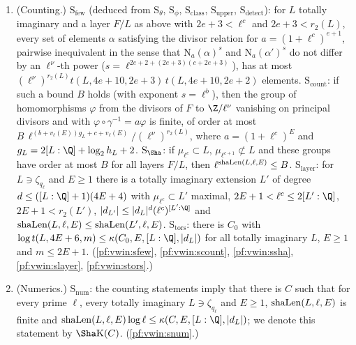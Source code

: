 \begin{enumerate}[label=(K\arabic*)]
$\Z/\ell^\nu$-module, the set of values $\ell^k\Phi(y)$ on cycles $y$ has at most $(\ell^\nu)^{r_2(L)}\,t(L,2k+6,k+1)\,t(L,2k+6,k)$ elements, where
$t(L,N,m)$ is the order of the torsion of $H_m(\GL_N(\OO_L),\Z)$. (\cref{pf:vwin:sclass}, \cref{pf:vwin:supper}.)
\item\label{pf:vwin:K6} (Counting.) $\mathrm{S}_{\mathrm{few}}$ (deduced from $\mathrm{S}_\theta$, $\mathrm{S}_\phi$, $\mathrm{S}_{\mathrm{class}}$,
$\mathrm{S}_{\mathrm{upper}}$, $\mathrm{S}_{\mathrm{detect}}$): for $L$ totally imaginary and a layer $F/L$ as above with $2e+3<\ell^c$ and
$2e+3<r_2(L)$, every set of elements $\alpha$ satisfying the divisor relation for $a=(1+\ell^c)^{e+1}$, pairwise inequivalent in the sense that
$\mathrm{N}_a(\alpha)^s$ and $\mathrm{N}_a(\alpha')^s$ do not differ by an $\ell^\nu$-th power ($s=\ell^{2e+2+(2e+3)(c+2e+3)}$), has at most
$(\ell^\nu)^{r_2(L)}t(L,4e+10,2e+3)\,t(L,4e+10,2e+2)$ elements. $\mathrm{S}_{\mathrm{count}}$: if such a bound $B$ holds (with exponent $s=\ell^b$), then the
group of homomorphisms $\varphi$ from the divisors of $F$ to $\Z/\ell^\nu$ vanishing on principal divisors and with $\varphi\circ\gamma^{-1}=a\varphi$ is finite,
of order at most $B\,\ell^{(b+v_\ell(E))g_L+c+v_\ell(E)}/(\ell^\nu)^{r_2(L)}$, where $a=(1+\ell^c)^E$ and $g_L=2[L:\Q]+\log_2h_L+2$.
$\mathrm{S}_\Sha$: if $\mu_{\ell^c}\subset L$, $\mu_{\ell^{c+1}}\not\subset L$ and these groups have order at most $B$ for all layers $F/L$, then
$\ell^{\mathrm{shaLen}(L,\ell,E)}\le B$. $\mathrm{S}_{\mathrm{layer}}$: for $L\ni\zeta_{q_\ell}$ and $E\ge1$ there is a totally imaginary extension $L'$ of degree
$d\le([L:\Q]+1)(4E+4)$ with $\mu_{\ell^c}\subset L'$ maximal, $2E+1<\ell^c\le2[L':\Q]$, $2E+1<r_2(L')$, $|d_{L'}|\le|d_L|^d(\ell^c)^{[L':\Q]}$ and
$\mathrm{shaLen}(L,\ell,E)\le\mathrm{shaLen}(L',\ell,E)$. $\mathrm{S}_{\mathrm{tors}}$: there is $C_0$ with $\log t(L,4E+6,m)\le\kappa(C_0,E,[L:\Q],|d_L|)$ for all
totally imaginary $L$, $E\ge1$ and $m\le2E+1$. (\cref{pf:vwin:sfew}, \cref{pf:vwin:scount}, \cref{pf:vwin:ssha}, \cref{pf:vwin:slayer}, \cref{pf:vwin:stors}.)
\item\label{pf:vwin:K7} (Numerics.) $\mathrm{S}_{\mathrm{num}}$: the counting statements imply that there is $C$ such that for every prime $\ell$, every
totally imaginary $L\ni\zeta_{q_\ell}$ and $E\ge1$, $\mathrm{shaLen}(L,\ell,E)$ is finite and $\vwinsh(L,\ell,E)\log\ell\le\kappa(C,E,[L:\Q],|d_L|)$; we denote this
statement by $\Sha\mathrm{K}(C)$. (\cref{pf:vwin:snum}.)
\end{enumerate}

